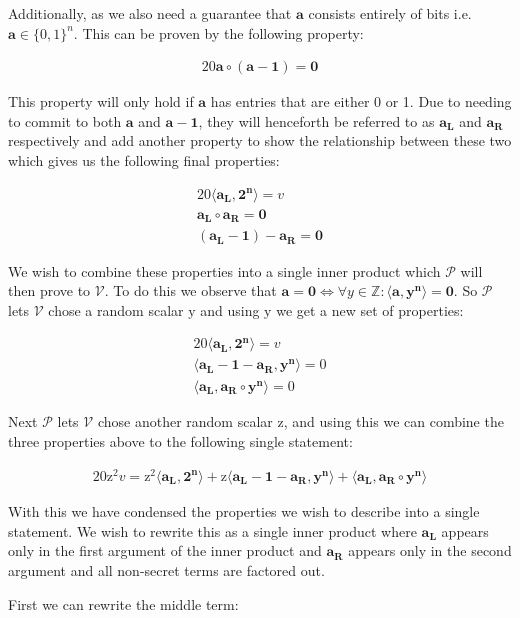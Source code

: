 \documentclass{article}
\newcommand{\eq}[1]{\begin{alignat*}{20}#1\end{alignat*}}
\renewcommand{\vec}[1]{\boldsymbol{#1}}
\newcommand{\ran}[1]{\mathrm{#1}}
\newcommand{\vecran}[1]{\mathbf{#1}}
\newcommand{\V}{\mathcal{V}}
\renewcommand{\P}{\mathcal{P}}
\newcommand{\dotp}[2]{\langle #1, #2 \rangle}
\newcommand{\opn}[1]{\operatorname{#1}}
\newcommand{\vecl}[1]{\vec{#1_{\opn{L}}}}
\newcommand{\vecr}[1]{\vec{#1_{\opn{R}}}}
\begin{document}
Additionally, as we also need a guarantee that $\vec{a}$ consists
entirely of bits i.e. $\vec{a} \in \{0,1\}^n$. This can be
proven by the following property:

\eq{\vec{a}\circ (\vec{a} - \vec{1}) = \vec{0}}

This property will only hold if $\vec{a}$ has entries that are either
0 or 1. Due to needing to commit to both $\vec{a}$ and $\vec{a}
- \vec{1}$, they will henceforth be referred to as $\vecl{a}$
and $\vecr{a}$ respectively and add another property to show the
relationship between these two which gives us the following final
properties:

\eq{
	\dotp{\vecl{a}}{\vec{2^n}} = v \\
	\vecl{a}\circ \vecr{a} = \vec{0} \\
	(\vecl{a} - \vec{1}) - \vecr{a} = \vec{0}
}

We wish to combine these properties into a single inner product which
$\P$ will then prove to $\V$. To do this we observe that $\vec{a}
= \vec{0} \iff \forall y\in\mathbb{Z}: \dotp{\vec{a}}{\vec{y^n}} =
\vec{0}$. So $\P$ lets $\V$ chose a random scalar $\ran{y}$ and using
$\ran{y}$ we get a new set of properties:

\eq{
	\dotp{\vecl{a}}{\vec{2^n}} = v \\
	\dotp{\vecl{a} - \vec{1} - \vecr{a}}{\vecran{y^n}} = 0 \\
	\dotp{\vecl{a}}{\vecr{a}\circ \vecran{y^n}} = 0
}

Next $\P$ lets $\V$ chose another random scalar $\ran{z}$, and using
this we can combine the three properties above to the following single
statement:

\eq{
	\ran{z^2}v = 
	\ran{z^2}\dotp{\vecl{a}}{\vec{2^n}} +
	\ran{z}\dotp{\vecl{a} - \vec{1} - \vecr{a}}{\vecran{y^n}} +
	\dotp{\vecl{a}}{\vecr{a}\circ \vecran{y^n}}
}

With this we have condensed the properties we wish to describe into
a single statement. We wish to rewrite this as a single inner product
where $\vecl{a}$ appears only in the first argument of the inner product
and $\vecr{a}$ appears only in the second argument and all non-secret
terms are factored out.

First we can rewrite the middle term:
\end{document}
